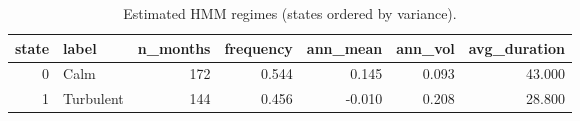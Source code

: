 \begin{table}[htbp]
\centering
\caption{Estimated HMM regimes (states ordered by variance).}
\label{tab:regimestats}
\small
\begin{tabular}{rlrrrrr}
\toprule
state & label & n\_months & frequency & ann\_mean & ann\_vol & avg\_duration \\
\midrule
0 & Calm & 172 & 0.544 & 0.145 & 0.093 & 43.000 \\
1 & Turbulent & 144 & 0.456 & -0.010 & 0.208 & 28.800 \\
\bottomrule
\end{tabular}
\end{table}
